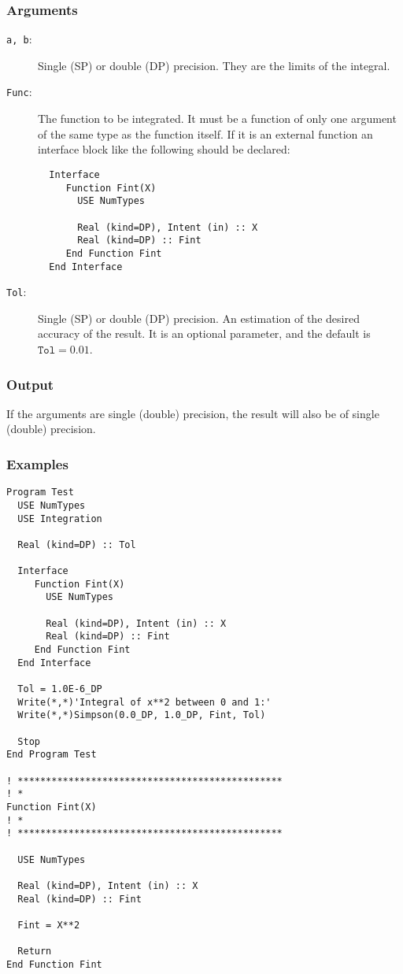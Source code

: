 \subsubsection{Arguments}

\begin{description}
\item[\texttt{a, b}:] Single (SP) or double (DP) precision. They are
  the limits of the integral.
\item[\texttt{Func}:] The function to be integrated. It must be a
  function of only one argument of the same type as the function
  itself. If it is an
  external function an interface block like the following should be
  declared: 
\begin{verbatim}
  Interface 
     Function Fint(X)
       USE NumTypes

       Real (kind=DP), Intent (in) :: X
       Real (kind=DP) :: Fint
     End Function Fint
  End Interface
\end{verbatim}
\item[\texttt{Tol}:] Single (SP) or double (DP) precision. An
  estimation of the desired accuracy of the result. It is an optional
  parameter, and the default is $\mathtt{Tol} = 0.01$. 
\end{description}


\subsubsection{Output}

If the arguments are single (double) precision, the result will also be of
single (double) precision. 


\subsubsection{Examples}

\begin{verbatim}
Program Test
  USE NumTypes
  USE Integration

  Real (kind=DP) :: Tol

  Interface 
     Function Fint(X)
       USE NumTypes

       Real (kind=DP), Intent (in) :: X
       Real (kind=DP) :: Fint
     End Function Fint
  End Interface

  Tol = 1.0E-6_DP
  Write(*,*)'Integral of x**2 between 0 and 1:'
  Write(*,*)Simpson(0.0_DP, 1.0_DP, Fint, Tol)

  Stop
End Program Test

! ***********************************************
! *
Function Fint(X)
! *  
! ***********************************************

  USE NumTypes

  Real (kind=DP), Intent (in) :: X
  Real (kind=DP) :: Fint

  Fint = X**2

  Return
End Function Fint
\end{verbatim}

